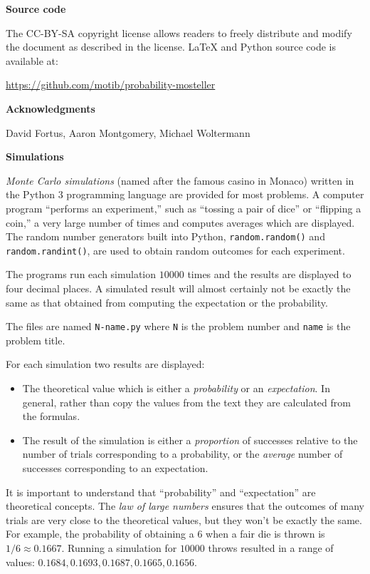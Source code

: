 \textbf{Source code}

The CC-BY-SA copyright license allows readers to freely distribute and modify the document as described in the license. \LaTeX{} and Python source code is available at:
\vspace*{-2ex}
\begin{center}
\url{https://github.com/motib/probability-mosteller}
\end{center}
\textbf{Acknowledgments}

David Fortus, Aaron Montgomery, Michael Woltermann

\newpage

\begin{center}
\textbf{\LARGE Simulations}
\end{center}


\bigskip

\emph{Monte Carlo simulations} (named after the famous casino in Monaco) written in the Python 3 programming language are provided for most problems. A computer program ``performs an experiment,'' such as ``tossing a pair of dice'' or ``flipping a coin,'' a very large number of times and computes averages which are displayed. The random number generators built into Python, \verb+random.random()+ and \verb+random.randint()+, are used to obtain random outcomes for each experiment.

The programs run each simulation $10000$ times and the results are displayed to four decimal places. A simulated result will almost certainly not be exactly the same as that obtained from computing the expectation or the probability.

The files are named \verb+N-name.py+ where \verb+N+ is the problem number and \verb+name+ is the problem title.

For each simulation two results are displayed: 
\begin{itemize}
\item The theoretical value which is either a \emph{probability} or an \emph{expectation}. In general, rather than copy the values from the text they are calculated from the formulas. 
\item The result of the simulation is either a \emph{proportion} of successes relative to the number of trials corresponding to a probability, or the \emph{average} number of successes corresponding to an expectation.
\end{itemize}
It is important to understand that ``probability'' and ``expectation'' are theoretical concepts. The \emph{law of large numbers} ensures that the outcomes of many trials are very close to the theoretical values, but they won't be exactly the same. For example, the probability of obtaining a $6$ when a fair die is thrown is $1/6\approx 0.1667$. Running a simulation for $10000$ throws resulted in a range of values: $0.1684, 0.1693, 0.1687, 0.1665, 0.1656$.


